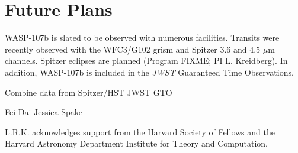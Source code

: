 \documentclass[twocolumn]{aastex61}
\begin{document}
\section{Future Plans}
WASP-107b is slated to be observed with numerous facilities. Transits were recently observed with the WFC3/G102 grism and Spitzer 3.6 and 4.5 $\mu$m channels. Spitzer eclipses are planned (Program FIXME; PI L. Kreidberg). In addition, WASP-107b is included in the \emph{JWST} Guaranteed Time Observations.

Combine data from Spitzer/HST
JWST GTO


\acknowledgments
Fei Dai
Jessica Spake

L.R.K. acknowledges support from the Harvard Society of Fellows and the Harvard Astronomy Department Institute for Theory and Computation.

\vspace{5mm}







\end{document}
